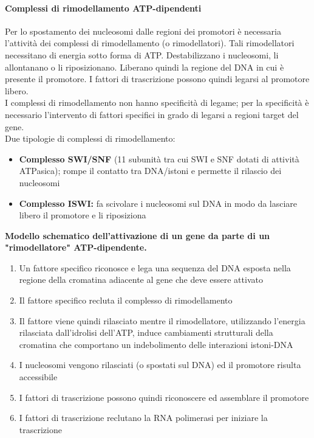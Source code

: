 \documentclass{article}
\begin{document}
\paragraph{Complessi di rimodellamento ATP-dipendenti}
Per lo spostamento dei nucleosomi dalle regioni dei promotori è
necessaria l'attività dei complessi di rimodellamento (o
rimodellatori). Tali rimodellatori necessitano di energia sotto
forma di ATP. Destabilizzano i nucleosomi, li allontanano o li
riposizionano. Liberano quindi la regione del DNA in cui è presente il promotore.
I fattori di trascrizione possono quindi legarsi al promotore libero.\\
I complessi di rimodellamento non hanno specificità di legame; per la specificità è necessario l'intervento di fattori specifici in grado di legarsi a regioni target del gene.\\
Due tipologie di complessi di rimodellamento:
\begin{itemize}
    \item \textbf{Complesso SWI/SNF }(11 subunità tra cui SWI e SNF dotati di attività
    ATPasica); rompe il contatto tra DNA/istoni e permette il rilascio dei
    nucleosomi
    \item \textbf{Complesso ISWI:} fa scivolare i nucleosomi sul DNA in modo da lasciare
    libero il promotore e li riposiziona
\end{itemize}
\begin{center}
    \textbf{Modello schematico dell'attivazione di un gene da parte di un "rimodellatore" ATP-dipendente.}
    \begin{enumerate}
        \item Un fattore specifico riconosce e lega una
        sequenza del DNA esposta nella regione della
        cromatina adiacente al gene che deve essere
        attivato
        \item Il fattore specifico recluta il complesso di
        rimodellamento
        \item Il fattore viene quindi rilasciato mentre il
        rimodellatore, utilizzando l'energia rilasciata
        dall'idrolisi dell'ATP, induce cambiamenti
        strutturali della cromatina che comportano un
        indebolimento delle interazioni istoni-DNA
        \item I nucleosomi vengono rilasciati (o spostati sul
        DNA) ed il promotore risulta accessibile
        \item I fattori di trascrizione possono quindi
        riconoscere ed assemblare il promotore
        \item I fattori di trascrizione reclutano la RNA
        polimerasi per iniziare la trascrizione
    \end{enumerate}
\end{center}
\end{document}
